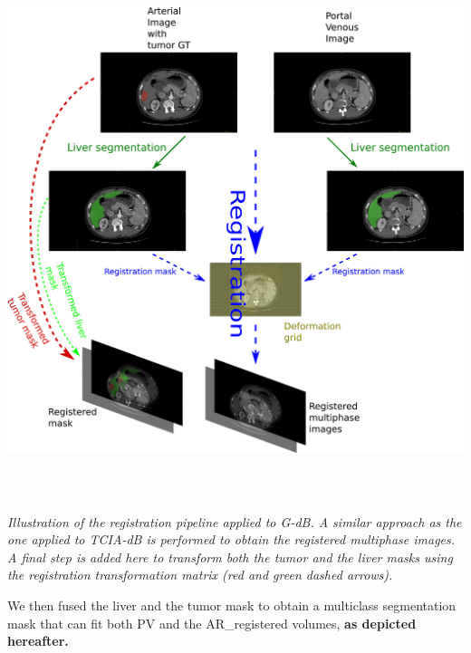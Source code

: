 \documentclass[]{article}
\begin{document}
\includegraphics[width=6.26772in,height=6.12500in]{./images/media/image23.png}

\emph{Illustration of the registration pipeline applied to G-dB. A
similar approach as the one applied to TCIA-dB is performed to obtain
the registered multiphase images. A final step is added here to
transform both the tumor and the liver masks using the registration
transformation matrix (red and green dashed arrows).}

We then fused the liver and the tumor mask to obtain a multiclass
segmentation mask that can fit both PV and the AR\_registered volumes,
\textbf{as depicted hereafter.}
\end{document}
